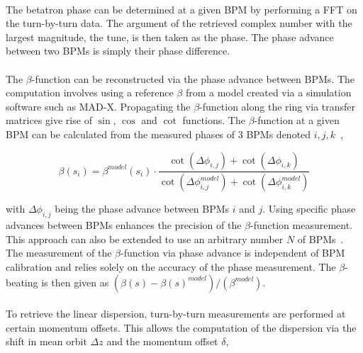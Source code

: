 \FloatBarrier

\paragraph{}
The betatron phase can be determined at a given BPM by performing a FFT on the turn-by-turn
data. The argument of the retrieved complex number with the largest magnitude, the tune, is then
taken as the phase. The phase advance between two BPMs is simply their phase difference.


\paragraph{} 
The $\beta$-function can be reconstructed via the phase advance between BPMs. The computation
involves using a reference $\beta$ from a model created via a simulation software such as MAD-X.
Propagating the $\beta$-function along the ring via transfer matrices give rise of $\sin$, $\cos$
and $\cot$ functions.
The $\beta$-function at a given BPM can be calculated from the measured phases of 3 BPMs denoted
$i, j, k$~\cite{minty_measurement_2003},

\begin{equation}
    \beta(s_i) = \beta^{model}(s_i) \cdot \frac{\cot(\Delta\phi_{i,j}) + \cot(\Delta\phi_{i,k})}{\cot\left(\Delta\phi_{i,j}^{model}\right) + \cot\left(\Delta\phi_{i, k}^{model}\right)}
\end{equation}

with $\Delta \phi_{i,j}$ being the phase advance between BPMs $i$ and $j$. Using specific phase
advances between BPMs enhances the precision of the $\beta$-function measurement. This approach can
also be extended to use an arbitrary number $N$ of
BPMs~\cite{langner_utilizing_2016,wegscheider_analytical_2017}. The measurement of the
$\beta$-function via phase advance is independent of BPM calibration and relies solely on the
accuracy of the phase measurement.
The $\beta$-beating is then given as $(\beta(s) - \beta(s)^{model})/(\beta^{model})$.


\paragraph{} To retrieve the linear dispersion, turn-by-turn measurements are
performed at certain momentum offsets. This allows the computation of the dispersion via the shift
in mean orbit $\Delta z$ and the momentum offset $\delta$,

